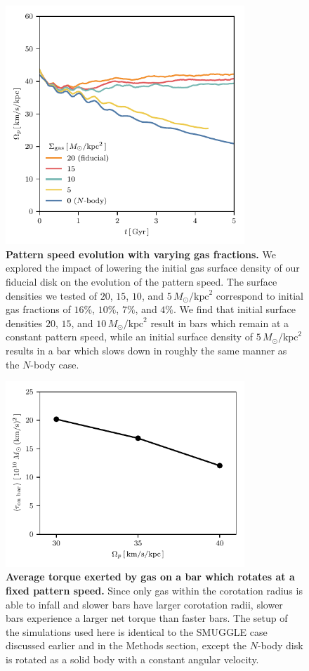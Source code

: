 \documentclass[twoside]{natureprintstyle}
\newcommand{\Nbody}{$N$-body}
\newcommand{\Msun}{\ensuremath{M_{\odot}}}
\begin{document}
\begin{figure}[t!]%
\centering
\includegraphics[width=9cm]{fig/ps_fgas.pdf}
\caption{\textbf{Pattern speed evolution with varying gas fractions.} We
explored the impact of lowering the initial gas surface density of our
fiducial disk on the evolution of the pattern speed. The surface densities we
tested of $20$, $15$, $10$, and $5\,\Msun/\textrm{kpc}^2$ correspond to
initial gas fractions of $16\%$, $10\%$, $7\%$, and $4\%$. We find that
initial surface densities $20$, $15$, and $10\,\Msun/\textrm{kpc}^2$ result in
bars which remain at a constant pattern speed, while an initial surface
density of $5\,\Msun/\textrm{kpc}^2$ results in a bar which slows down in
roughly the same manner as the \Nbody{} case. }
\label{fig:fgas}
\end{figure}

\begin{figure}[h!]
\centering
\includegraphics[width=9cm]{fig/torque_ps.pdf}
\caption{\textbf{Average torque exerted by gas on a bar which rotates at a
fixed pattern speed.} Since only gas within the corotation radius is able to
infall and slower bars have larger corotation radii, slower bars experience a
larger net torque than faster bars. The setup of the simulations used here is
identical to the SMUGGLE case discussed earlier and in the Methods section,
except the \Nbody{} disk is rotated as a solid body with a constant angular
velocity.}\label{fig:equil}
\end{figure}
\end{document}
